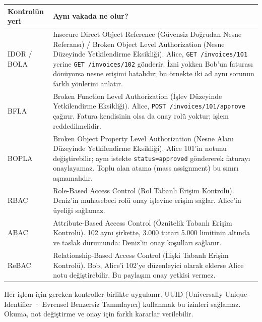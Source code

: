 \documentclass[11pt,a4paper]{article}
\begin{document}
\begingroup\small\begin{tabularx}{\linewidth}{@{}LY@{}}\toprule
Kontrolün yeri & Aynı vakada ne olur?\\\midrule
IDOR / BOLA & Insecure Direct Object Reference (Güvensiz Doğrudan Nesne Referansı) / Broken Object Level Authorization (Nesne Düzeyinde Yetkilendirme Eksikliği). Alice, \texttt{GET /invoices/101} yerine \texttt{GET /invoices/102} gönderir. İzni yokken Bob’un faturası dönüyorsa nesne erişimi hatalıdır; bu örnekte iki ad aynı sorunun farklı yönlerini anlatır.\\[2pt]
BFLA & Broken Function Level Authorization (İşlev Düzeyinde Yetkilendirme Eksikliği). Alice, \texttt{POST /invoices/101/approve} çağırır. Fatura kendisinin olsa da onay rolü yoktur; işlem reddedilmelidir.\\[2pt]
BOPLA & Broken Object Property Level Authorization (Nesne Alanı Düzeyinde Yetkilendirme Eksikliği). Alice 101’in notunu değiştirebilir; aynı istekte \texttt{status=approved} göndererek faturayı onaylayamaz. Toplu alan atama (mass assignment) bu sınırı aşmamalıdır.\\[2pt]
RBAC & Role-Based Access Control (Rol Tabanlı Erişim Kontrolü). Deniz’in muhasebeci rolü onay işlevine erişim sağlar. Alice’in üyeliği sağlamaz.\\[2pt]
ABAC & Attribute-Based Access Control (Öznitelik Tabanlı Erişim Kontrolü). 102 aynı şirkette, 3.000 tutarı 5.000 limitinin altında ve taslak durumunda: Deniz’in onay koşulları sağlanır.\\[2pt]
ReBAC & Relationship-Based Access Control (İlişki Tabanlı Erişim Kontrolü). Bob, Alice’i 102’ye düzenleyici olarak eklerse Alice notu değiştirebilir. Bu paylaşım onay yetkisi vermez.\\[2pt]
\bottomrule\end{tabularx}\endgroup\par
Her işlem için gereken kontroller birlikte uygulanır. UUID (Universally Unique Identifier · Evrensel Benzersiz Tanımlayıcı) kullanmak bu izinleri sağlamaz. Okuma, not değiştirme ve onay için farklı kararlar verilebilir.
\end{document}
